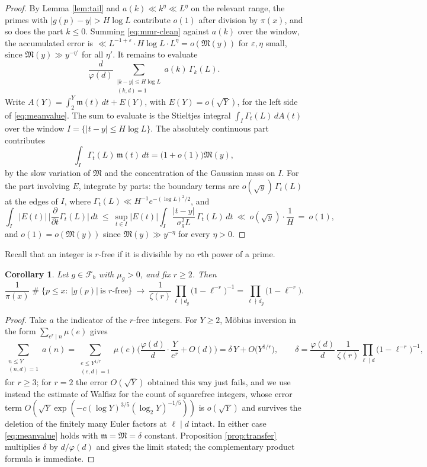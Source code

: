 \documentclass[11pt,reqno]{amsart}
\theoremstyle{plain}
\newtheorem{corollary}[theorem]{Corollary}
\theoremstyle{definition}
\DeclareMathOperator{\Card}{\#}
\begin{document}
\begin{proof}
By Lemma \ref{lem:tail} and $a(k)\ll k^{\eta}\ll L^{\eta}$ on the relevant range, the primes with $|g(p)-y|>H\log L$ contribute $o(1)$ after division by $\pi(x)$, and so does the part $k\le0$. Summing \eqref{eq:mmr-clean} against $a(k)$ over the window, the accumulated error is $\ll L^{-1+\varepsilon}\cdot H\log L\cdot L^{\eta}=o(\mathfrak M(y))$ for $\varepsilon,\eta$ small, since $\mathfrak M(y)\gg y^{-\eta'}$ for all $\eta'$. It remains to evaluate
\[
\frac d{\varphi(d)}\sum_{\substack{|k-y|\le H\log L\\ (k,d)=1}}a(k)\,\Gamma_k(L).
\]
Write $A(Y)=\int_2^Y\mathfrak m(t)\,dt+E(Y)$, with $E(Y)=o(\sqrt Y)$, for the left side of \eqref{eq:meanvalue}. The sum to evaluate is the Stieltjes integral $\int_I\Gamma_t(L)\,dA(t)$ over the window $I=\{|t-y|\le H\log L\}$. The absolutely continuous part contributes
\[
\int_I\Gamma_t(L)\,\mathfrak m(t)\,dt=\big(1+o(1)\big)\mathfrak M(y),
\]
by the slow variation of $\mathfrak M$ and the concentration of the Gaussian mass on $I$. For the part involving $E$, integrate by parts: the boundary terms are $o(\sqrt y)\,\Gamma_t(L)$ at the edges of $I$, where $\Gamma_t(L)\ll H^{-1}e^{-(\log L)^{2}/2}$, and
\[
\int_I|E(t)|\,\Big|\frac{\partial}{\partial t}\Gamma_t(L)\Big|\,dt
\ \le\ \sup_{t\in I}|E(t)|\int_I\frac{|t-y|}{\sigma_g^{2}L}\,\Gamma_t(L)\,dt
\ \ll\ o(\sqrt y)\cdot\frac1H\ =\ o(1),
\]
and $o(1)=o(\mathfrak M(y))$ since $\mathfrak M(y)\gg y^{-\eta}$ for every $\eta>0$.
\end{proof}

Recall that an integer is $r$-free if it is divisible by no $r$th power of a prime.

\begin{corollary}\label{cor:rfree}
Let $g\in\mathcal F_b$ with $\mu_g>0$, and fix $r\ge2$. Then
\[
\frac1{\pi(x)}\Card\{p\le x:\ |g(p)|\ \text{is $r$-free}\}
\ \longrightarrow\ \frac1{\zeta(r)}\prod_{\ell\mid d_g}\big(1-\ell^{-r}\big)^{-1}
=\prod_{\ell\nmid d_g}\big(1-\ell^{-r}\big).
\]
\end{corollary}

\begin{proof}
Take $a$ the indicator of the $r$-free integers. For $Y\ge2$, M\"obius inversion in the form $\sum_{e^{r}\mid n}\mu(e)$ gives
\[
\sum_{\substack{n\le Y\\ (n,d)=1}}a(n)
=\sum_{\substack{e\le Y^{1/r}\\ (e,d)=1}}\mu(e)\Big(\frac{\varphi(d)}d\cdot\frac Y{e^{r}}+O(d)\Big)
=\delta\,Y+O\big(Y^{1/r}\big),
\qquad
\delta=\frac{\varphi(d)}d\,\frac1{\zeta(r)}\prod_{\ell\mid d}\big(1-\ell^{-r}\big)^{-1},
\]
for $r\ge3$; for $r=2$ the error $O(\sqrt Y)$ obtained this way just fails, and we use instead the estimate of Walfisz \cite[Chapter 5]{walfisz} for the count of squarefree integers, whose error term $O(\sqrt Y\exp(-c(\log Y)^{3/5}(\log_2Y)^{-1/5}))$ is $o(\sqrt Y)$ and survives the deletion of the finitely many Euler factors at $\ell\mid d$ intact. In either case \eqref{eq:meanvalue} holds with $\mathfrak m=\mathfrak M=\delta$ constant. Proposition \ref{prop:transfer} multiplies $\delta$ by $d/\varphi(d)$ and gives the limit stated; the complementary product formula is immediate.
\end{proof}
\end{document}
